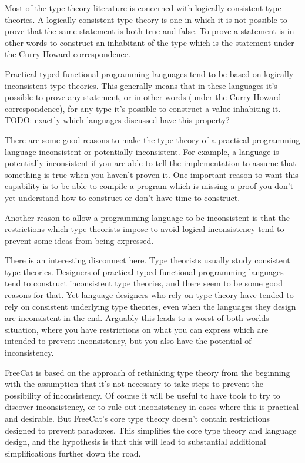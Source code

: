 \documentclass{article}
\begin{document}
Most of the type theory literature is concerned with logically consistent type theories. A logically consistent type theory is one in which it is not possible to prove that the same statement is both true and false. To prove a statement is in other words to construct an inhabitant of the type which is the statement under the Curry-Howard correspondence.

Practical typed functional programming languages tend to be based on logically inconsistent type theories. This generally means that in these languages it's possible to prove any statement, or in other words (under the Curry-Howard correspondence), for any type it's possible to construct a value inhabiting it. TODO: exactly which languages discussed have this property?

There are some good reasons to make the type theory of a practical programming language inconsistent or potentially inconsistent. For example, a language is potentially inconsistent if you are able to tell the implementation to assume that something is true when you haven't proven it. One important reason to want this capability is to be able to compile a program which is missing a proof you don't yet understand how to construct or don't have time to construct.

Another reason to allow a programming language to be inconsistent is that the restrictions which type theorists impose to avoid logical inconsistency tend to prevent some ideas from being expressed.

There is an interesting disconnect here. Type theorists usually study consistent type theories. Designers of practical typed functional programming languages tend to construct inconsistent type theories, and there seem to be some good reasons for that. Yet language designers who rely on type theory have tended to rely on consistent underlying type theories, even when the languages they design are inconsistent in the end. Arguably this leads to a worst of both worlds situation, where you have restrictions on what you can express which are intended to prevent inconsistency, but you also have the potential of inconsistency.

FreeCat is based on the approach of rethinking type theory from the beginning with the assumption that it's not necessary to take steps to prevent the possibility of inconsistency. Of course it will be useful to have tools to try to discover inconsistency, or to rule out inconsistency in cases where this is practical and desirable. But FreeCat's core type theory doesn't contain restrictions designed to prevent paradoxes. This simplifies the core type theory and language design, and the hypothesis is that this will lead to substantial additional simplifications further down the road.
\end{document}

